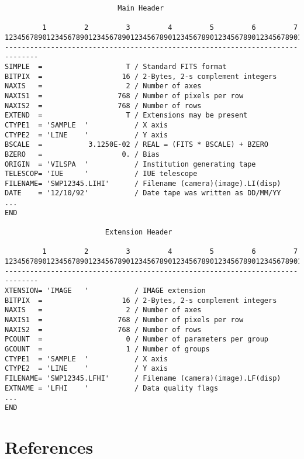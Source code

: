 {\small
\begin{verbatim}
                           Main Header

         1         2         3         4         5         6         7
123456789012345678901234567890123456789012345678901234567890123456789012345...
------------------------------------------------------------------------------
SIMPLE  =                    T / Standard FITS format
BITPIX  =                   16 / 2-Bytes, 2-s complement integers
NAXIS   =                    2 / Number of axes
NAXIS1  =                  768 / Number of pixels per row
NAXIS2  =                  768 / Number of rows
EXTEND  =                    T / Extensions may be present
CTYPE1  = 'SAMPLE  '           / X axis
CTYPE2  = 'LINE    '           / Y axis 
BSCALE  =           3.1250E-02 / REAL = (FITS * BSCALE) + BZERO
BZERO   =                   0. / Bias
ORIGIN  = 'VILSPA  '           / Institution generating tape
TELESCOP= 'IUE     '           / IUE telescope
FILENAME= 'SWP12345.LIHI'      / Filename (camera)(image).LI(disp)
DATE    = '12/10/92'           / Date tape was written as DD/MM/YY
...
END

                        Extension Header

         1         2         3         4         5         6         7
123456789012345678901234567890123456789012345678901234567890123456789012345...
------------------------------------------------------------------------------
XTENSION= 'IMAGE   '           / IMAGE extension
BITPIX  =                   16 / 2-Bytes, 2-s complement integers
NAXIS   =                    2 / Number of axes
NAXIS1  =                  768 / Number of pixels per row
NAXIS2  =                  768 / Number of rows
PCOUNT  =                    0 / Number of parameters per group 
GCOUNT  =                    1 / Number of groups
CTYPE1  = 'SAMPLE  '           / X axis
CTYPE2  = 'LINE    '           / Y axis
FILENAME= 'SWP12345.LFHI'      / Filename (camera)(image).LF(disp)
EXTNAME = 'LFHI    '           / Data quality flags 
...
END
\end{verbatim}
}

\newpage

\section{References}

